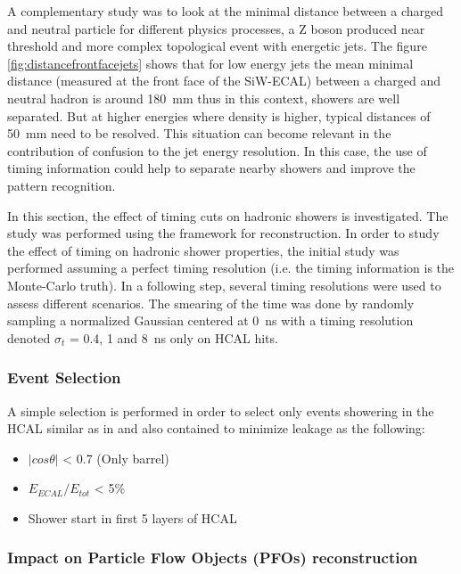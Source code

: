 A complementary study was to look at the minimal distance between a charged and neutral particle for different physics processes, a Z boson produced near threshold and more complex topological event with energetic jets. The figure \ref{fig:distancefrontfacejets} shows that for low energy jets the mean minimal distance (measured at the front face of the SiW-ECAL) between a charged and neutral hadron is around \SI{180}{\milli\meter} thus in this context, showers are well separated. But at higher energies where density is higher, typical distances of \SI{50}{\milli\meter} need to be resolved. This situation can become relevant in the contribution of confusion to the jet energy resolution. In this case, the use of timing information could help to separate nearby showers and improve the pattern recognition.

In this section, the effect of timing cuts on hadronic showers is investigated. The study was performed using the \ilcsoft framework for reconstruction. In order to study the effect of timing on hadronic shower properties, the initial study was performed assuming a perfect timing resolution (i.e. the timing information is the Monte-Carlo truth). In a following step, several timing resolutions were used to assess different scenarios. The smearing of the time was done by randomly sampling a normalized Gaussian centered at \SI{0}{\nano\second} with a timing resolution denoted $\sigma_{t}$ = 0.4, 1 and \SI{8}{\nano\second} only on HCAL hits.

\subsubsection{Event Selection}

A simple selection is performed in order to select only events showering in the HCAL similar as in \cite{SoftCompNew2012} and also contained to minimize leakage as the following:
\begin{itemize}
  \item $|cos\theta|$ < 0.7 (Only barrel)
  \item $E_{ECAL}/E_{tot}$ < 5\%
  \item Shower start in first 5 layers of HCAL
\end{itemize}

\subsubsection{Impact on Particle Flow Objects (PFOs) reconstruction}

